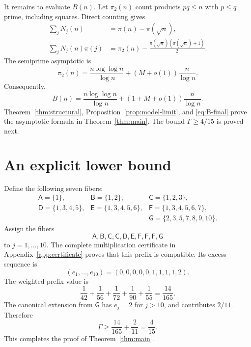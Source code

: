 \documentclass[11pt,reqno]{article}
\theoremstyle{definition}
\begin{document}
It remains to evaluate \(B(n)\).  Let \(\pi_2(n)\) count products
\(pq\leq n\) with \(p\leq q\) prime, including squares.  Direct counting
gives
\begin{align}
  \sum_jN_j(n)&=\pi(n)-\pi(\sqrt n),\label{eq:prime-count}\\
  \sum_jN_j(n)\pi(j)
   &=\pi_2(n)-\frac{\pi(\sqrt n)(\pi(\sqrt n)+1)}2.
   \label{eq:semiprime-count}
\end{align}
The semiprime asymptotic
\cite[Theorem~1, equation~(17)]{CrisanErban2021} is
\[
  \pi_2(n)
  =\frac{n\log\log n}{\log n}
   +(M+o(1))\frac n{\log n}.
\]
Consequently,
\begin{equation}\label{eq:B-final}
  B(n)=\frac{n\log\log n}{\log n}
       +(1+M+o(1))\frac n{\log n}.
\end{equation}
Theorem~\ref{thm:structural}, Proposition~\ref{prop:model-limit}, and
\eqref{eq:B-final} prove the asymptotic formula in
Theorem~\ref{thm:main}.  The bound \(\Gamma\geq4/15\) is proved next.

\section{An explicit lower bound}\label{sec:certificate}

Define the following seven fibers:
\[
\begin{array}{lll}
  \mathsf A=\{1\},&
  \mathsf B=\{1,2\},&
  \mathsf C=\{1,2,3\},\\[2pt]
  \mathsf D=\{1,3,4,5\},&
  \mathsf E=\{1,3,4,5,6\},&
  \mathsf F=\{1,3,4,5,6,7\},\\[2pt]
  &&\mathsf G=\{2,3,5,7,8,9,10\}.
\end{array}
\]
Assign the fibers
\[
  \mathsf A,\mathsf B,\mathsf C,\mathsf C,\mathsf D,
  \mathsf E,\mathsf F,\mathsf F,\mathsf F,\mathsf G
\]
to \(j=1,\ldots,10\).  The complete multiplication certificate in
Appendix~\ref{app:certificate} proves that this prefix is compatible.  Its excess
sequence is
\[
  (e_1,\ldots,e_{10})=(0,0,0,0,0,1,1,1,1,2).
\]
The weighted prefix value is
\[
  \frac1{42}+\frac1{56}+\frac1{72}+\frac1{90}+\frac1{55}
  =\frac{14}{165}.
\]
The canonical extension from \(\mathsf G\) has \(e_j=2\) for \(j>10\),
and contributes \(2/11\).  Therefore
\begin{equation}\label{eq:four-fifteenths}
  \Gamma\geq\frac{14}{165}+\frac2{11}
  =\frac4{15}.
\end{equation}
This completes the proof of Theorem~\ref{thm:main}.

\appendix
\end{document}
